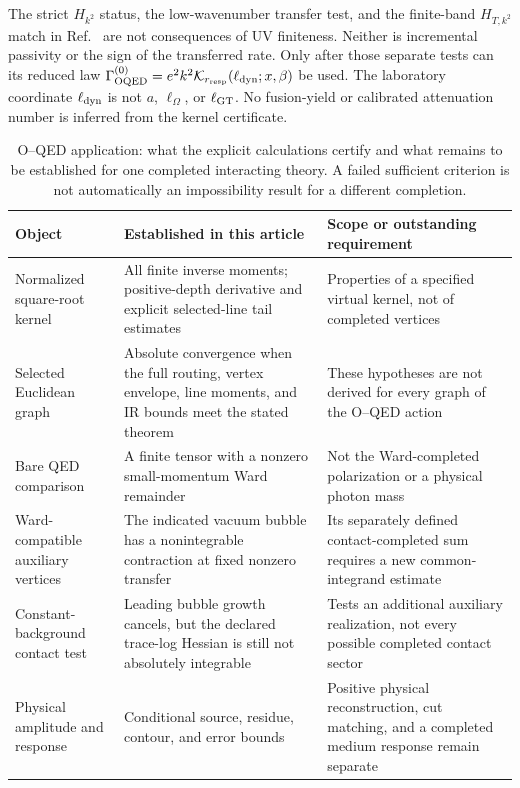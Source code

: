 \documentclass[final,5p,times,twocolumn,numbers,nopreprintline]{elsarticle}
\numberwithin{equation}{section}
\theoremstyle{definition}
\theoremstyle{remark}
\begin{document}
The strict \(H_{k^2}\) status, the low-wavenumber transfer test, and the
finite-band \(H_{T,k^2}\) match in Ref.~\cite{ChiapponeIgnition} are
not consequences of UV finiteness. Neither is incremental passivity or
the sign of the transferred rate. Only after those separate tests can
its reduced law \(\Gamma_{\rm OQED}^{(0)}=e^2k^2
\mathcal K_{r_{\rm resp}}(\ell_{\rm dyn};x,\beta)\) be used.
The laboratory coordinate \(\ell_{\rm dyn}\) is not \(a\),
\(\ell_\Omega\), or \(\ell_{\rm GT}\). No fusion-yield or calibrated
attenuation number is inferred from the kernel certificate.

\begin{table}[t]
\centering
\small
\setlength{\tabcolsep}{5pt}
\renewcommand{\arraystretch}{1.15}
\caption{O--QED application: what the explicit calculations certify and
what remains to be established for one completed interacting theory.
A failed sufficient criterion is not automatically an impossibility
result for a different completion.}
\label{tab:OQED-certification-status}
\begin{tabularx}{\textwidth}{@{}>{\raggedright\arraybackslash}p{}
 >{\raggedright\arraybackslash}p{}
 >{\raggedright\arraybackslash}X@{}}
\toprule
Object & Established in this article & Scope or outstanding requirement\\
\midrule
Normalized square-root kernel & All finite inverse moments; positive-depth derivative and explicit selected-line tail estimates & Properties of a specified virtual kernel, not of completed vertices\\
Selected Euclidean graph & Absolute convergence when the full routing, vertex envelope, line moments, and IR bounds meet the stated theorem & These hypotheses are not derived for every graph of the O--QED action\\
Bare QED comparison & A finite tensor with a nonzero small-momentum Ward remainder & Not the Ward-completed polarization or a physical photon mass\\
Ward-compatible auxiliary vertices & The indicated vacuum bubble has a nonintegrable contraction at fixed nonzero transfer & Its separately defined contact-completed sum requires a new common-integrand estimate\\
Constant-background contact test & Leading bubble growth cancels, but the declared trace-log Hessian is still not absolutely integrable & Tests an additional auxiliary realization, not every possible completed contact sector\\
Physical amplitude and response & Conditional source, residue, contour, and error bounds & Positive physical reconstruction, cut matching, and a completed medium response remain separate\\
\bottomrule
\end{tabularx}
\end{table}
\end{document}
